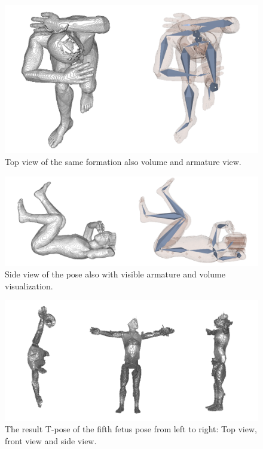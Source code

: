 \begin{figure} [htb!]
    \centering
	\includegraphics[width=13cm]{content/images/results/man5Top.png}
	\caption{Top view of the same formation also volume and armature view.}
	\label{fig:}
\end{figure}

\begin{figure} [htb!]
    \centering
	\includegraphics[width=15cm]{content/images/results/man5Side.png}
	\caption{Side view of the pose also with visible armature and volume visualization.}
	\label{fig:}
\end{figure}
\vspace{3cm}
\begin{figure} [htb!]
    \centering
	\includegraphics[width=16cm]{content/images/results/man5Result.png}
	\caption{The result T-pose of the fifth fetus pose from left to right: Top view, front view and side view.}
	\label{fig:}
\end{figure}

